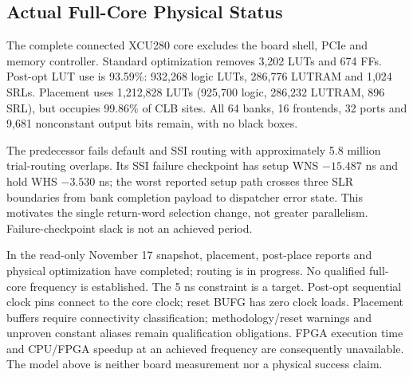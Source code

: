 \subsection{Actual Full-Core Physical Status}

The complete connected XCU280 core excludes the board shell, PCIe and memory controller. Standard optimization removes 3,202 LUTs and 674 FFs. Post-opt LUT use is 93.59\%: 932,268 logic LUTs, 286,776 LUTRAM and 1,024 SRLs. Placement uses 1,212,828 LUTs (925,700 logic, 286,232 LUTRAM, 896 SRL), but occupies 99.86\% of CLB sites. All 64 banks, 16 frontends, 32 ports and 9,681 nonconstant output bits remain, with no black boxes.

The predecessor fails default and SSI routing with approximately 5.8 million trial-routing overlaps. Its SSI failure checkpoint has setup WNS $-15.487$ ns and hold WHS $-3.530$ ns; the worst reported setup path crosses three SLR boundaries from bank completion payload to dispatcher error state. This motivates the single return-word selection change, not greater parallelism. Failure-checkpoint slack is not an achieved period.

In the read-only November 17 snapshot, placement, post-place reports and physical optimization have completed; routing is in progress. No qualified full-core frequency is established. The 5 ns constraint is a target. Post-opt sequential clock pins connect to the core clock; reset BUFG has zero clock loads. Placement buffers require connectivity classification; methodology/reset warnings and unproven constant aliases remain qualification obligations. FPGA execution time and CPU/FPGA speedup at an achieved frequency are consequently unavailable. The model above is neither board measurement nor a physical success claim.
